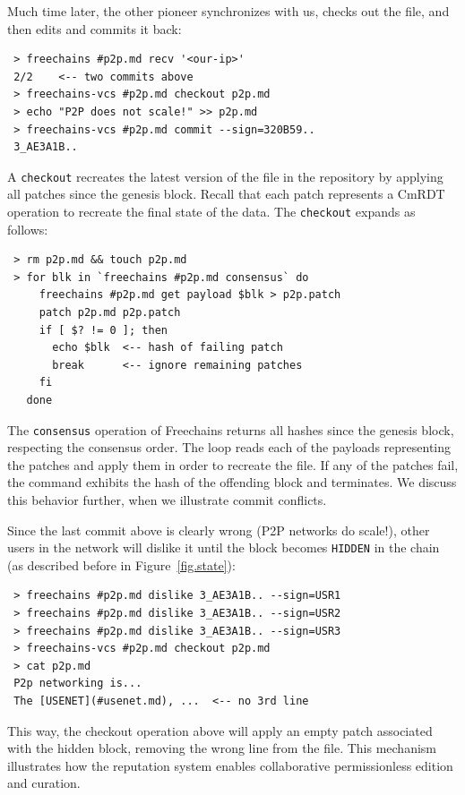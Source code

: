 \documentclass[10pt,journal,compsoc]{IEEEtran}
\newcommand{\FC}       {Freechains\xspace}
\newcommand{\code}[1]  {\texttt{\footnotesize{#1}}}
\begin{document}
Much time later, the other pioneer synchronizes with us, checks out the file,
and then edits and commits it back:

{\footnotesize
\begin{verbatim}
 > freechains #p2p.md recv '<our-ip>'
 2/2    <-- two commits above
 > freechains-vcs #p2p.md checkout p2p.md
 > echo "P2P does not scale!" >> p2p.md
 > freechains-vcs #p2p.md commit --sign=320B59..
 3_AE3A1B..
\end{verbatim}
}

A \code{checkout} recreates the latest version of the file in the repository by
applying all patches since the genesis block.
Recall that each patch represents a CmRDT operation to recreate the final state
of the data.
The \code{checkout} expands as follows:

{\footnotesize
\begin{verbatim}
 > rm p2p.md && touch p2p.md
 > for blk in `freechains #p2p.md consensus` do
     freechains #p2p.md get payload $blk > p2p.patch
     patch p2p.md p2p.patch
     if [ $? != 0 ]; then
       echo $blk  <-- hash of failing patch
       break      <-- ignore remaining patches
     fi
   done
\end{verbatim}
}

The \code{consensus} operation of \FC returns all hashes since
the genesis block, respecting the consensus order.
The loop reads each of the payloads representing the patches and apply them in
order to recreate the file.
If any of the patches fail, the command exhibits the hash of the offending
block and terminates.
We discuss this behavior further, when we illustrate commit conflicts.

Since the last commit above is clearly wrong (P2P networks do scale!), other
users in the network will dislike it until the block becomes
\code{HIDDEN} in the chain (as described before in Figure~\ref{fig.state}):

{\footnotesize
\begin{verbatim}
 > freechains #p2p.md dislike 3_AE3A1B.. --sign=USR1
 > freechains #p2p.md dislike 3_AE3A1B.. --sign=USR2
 > freechains #p2p.md dislike 3_AE3A1B.. --sign=USR3
 > freechains-vcs #p2p.md checkout p2p.md
 > cat p2p.md
 P2p networking is...
 The [USENET](#usenet.md), ...  <-- no 3rd line
\end{verbatim}
}

This way, the checkout operation above will apply an empty patch associated
with the hidden block, removing the wrong line from the file.
This mechanism illustrates how the reputation system enables collaborative
permissionless edition and curation.
\end{document}

